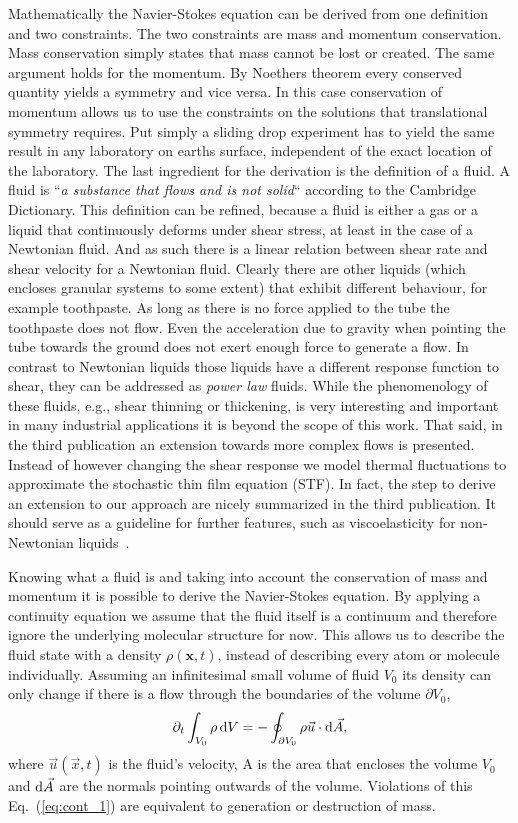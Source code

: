 Mathematically the Navier-Stokes equation can be derived from one definition and two constraints.
The two constraints are mass and momentum conservation.
Mass conservation simply states that mass cannot be lost or created.
The same argument holds for the momentum.
By Noethers theorem every conserved quantity yields a symmetry and vice versa.
In this case conservation of momentum allows us to use the constraints on the solutions that translational symmetry requires.
Put simply a sliding drop experiment has to yield the same result in any laboratory on earths surface, independent of the exact location of the laboratory.
The last ingredient for the derivation is the definition of a fluid.
A fluid is ``\textit{a substance that flows and is not solid}`` according to the Cambridge Dictionary.
This definition can be refined, because a fluid is either a gas or a liquid that continuously deforms under shear stress, at least in the case of a Newtonian fluid.
And as such there is a linear relation between shear rate and shear velocity for a Newtonian fluid.
Clearly there are other liquids (which encloses granular systems to some extent) that exhibit different behaviour, for example toothpaste.
As long as there is no force applied to the tube the toothpaste does not flow.
Even the acceleration due to gravity when pointing the tube towards the ground does not exert enough force to generate a flow.
In contrast to Newtonian liquids those liquids have a different response function to shear, they can be addressed as \textit{power law} fluids.
While the phenomenology of these fluids, e.g., shear thinning or thickening, is very interesting and important in many industrial applications it is beyond the scope of this work. 
That said, in the third publication an extension towards more complex flows is presented. 
Instead of however changing the shear response we model thermal fluctuations to approximate the stochastic thin film equation (STF).
In fact, the step to derive an extension to our approach are nicely summarized in the third publication. 
It should serve as a guideline for further features, such as viscoelasticity for non-Newtonian liquids~\cite{bouchutNewModelShallow2013}. 

Knowing what a fluid is and taking into account the conservation of mass and momentum it is possible to derive the Navier-Stokes equation. 
By applying a continuity equation we assume that the fluid itself is a continuum and therefore ignore the underlying molecular structure for now. 
This allows us to describe the fluid state with a density $\rho(\mathbf{x},t)$, instead of describing every atom or molecule individually.
Assuming an infinitesimal small volume of fluid $V_0$ its density can only change if there is a flow through the boundaries of the volume $\partial V_0$,
\begin{equation}\label{eq:cont_1}
    \partial_t\int_{V_0}\rho\mathop{}\!\mathrm{d} V = -\oint_{\partial V_0} \rho\vec{u}\cdot\mathop{}\!\mathrm{d} \vec{A}, 
\end{equation}
where $\vec{u}(\vec{x},t)$ is the fluid's velocity, A is the area that encloses the volume $V_0$ and $\mathop{}\!\mathrm{d}\vec{A}$ are the normals pointing outwards of the volume.
Violations of this Eq.~(\ref{eq:cont_1}) are equivalent to generation or destruction of mass.

